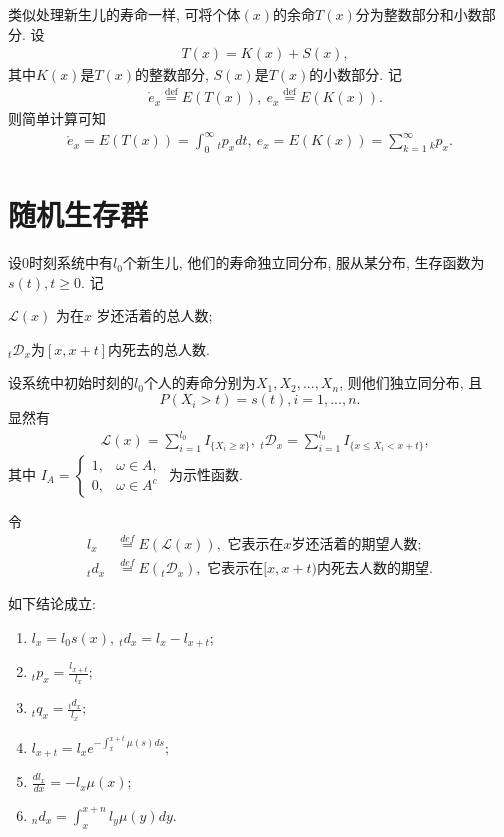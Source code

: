 \documentclass[lang=cn,10pt]{elegantbook}
\begin{document}
\begin{definition}[个体$(x)$的整数与分数余命及期望]
	类似处理新生儿的寿命一样, 可将个体$(x)$的余命$T(x)$分为整数部分和小数部分.
设
\begin{align*}
     & T(x)=K(x)+S(x),
\end{align*}
其中$K(x)$是$T(x)$的整数部分, $S(x)$是$T(x)$的小数部分. 记
\begin{align*}
     & \mathring{e}_x\stackrel{\text{def}}{=}E(T(x)), \   {e_x}\stackrel{\text{def}}{=}E(K(x)).
\end{align*}
则简单计算可知 \begin{align*}
    \mathring{e}_x =E(T(x))=\int_{0}^{\infty}{_tp_xdt}, ~
    {e_x}          =E(K(x))=\sum_{k=1}^{\infty}{_kp_x}.
\end{align*}
\end{definition}

\section{随机生存群}
\begin{definition}[模型描述]
	设0时刻系统中有$l_0$个新生儿, 他们的寿命独立同分布, 服从某分布, 生存函数为$s(t),t\ge 0.$  记

$\mathscr{L}(x)$ 为在$x$ 岁还活着的总人数;

$_t \mathscr{D}_x$为$[x,x+t]$内死去的总人数.

设系统中初始时刻的$l_0$个人的寿命分别为$X_1,X_2,...,X_n$, 则他们独立同分布, 且
$$P(X_i>t)=s(t), i=1,...,n.$$
显然有
\begin{align*}
     & \mathscr{L}(x)=\sum_{i=1}^{l_0}I_{\{X_{i}\geqslant x\}},\ {}_t\mathscr{D}_x=\sum_{i=1}^{l_0}I_{\{ x\leqslant X_i<x+t\}},
\end{align*}
其中
$
    I_{A}=\left\{\begin{array}{ll}1,&\omega\in A,\\0,&\omega\in A^c\end{array}\right.
$ 为示性函数.

令 \begin{align*}
    l_x     & \overset{def}{=}E(\mathscr L(x)), \text{ 它表示在}x\text{岁还活着的期望人数};         \\
    {}_td_x & \overset{def}{=}E({}_t\mathscr D_x ),\text{ 它表示在}[x,x+t)\text{内死去人数的期望}.
\end{align*}
\end{definition}

\begin{corollary} 如下结论成立:
	\begin{enumerate}
		\item $l_x=l_0s(x),\ {}_td_x=l_x-l_{x+t};$
		\item ${}_tp_x=\frac{l_{x+t}}{l_x};$
		\item ${}_tq_x=\frac{{}_td_x}{l_x};$
		\item $l_{x+t}=l_xe^{-\int_{x}^{x+t}\mu(s)ds};$
		\item $\frac{dl_x}{dx}=-l_x\mu(x);$
		\item $_nd_x=\int_{x}^{x+n}l_y\mu(y)dy.$
	\end{enumerate}
\end{corollary}
\end{document}
